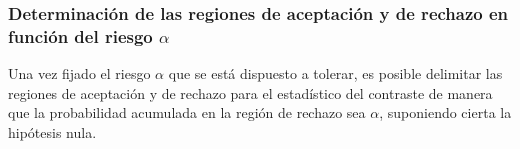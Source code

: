 \begin{frame}
\frametitle{Determinación de las regiones de aceptación y de rechazo en función del riesgo $\alpha$}
Una vez fijado el riesgo $\alpha$ que se está dispuesto a tolerar, es posible delimitar las regiones de aceptación y de rechazo para el estadístico del contraste de manera que la probabilidad acumulada en la región de rechazo sea $\alpha$, suponiendo cierta la hipótesis nula.
\end{frame}


